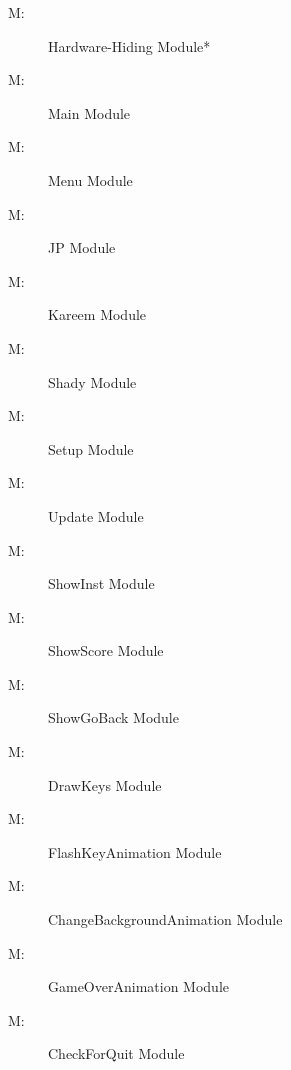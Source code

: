 \documentclass[12pt, titlepage]{article}
\newcounter{mnum}
\newcommand{\mthemnum}{M\themnum}
\begin{document}
\begin{description}
\item [ \mthemnum \label{mHH1}:] Hardware-Hiding Module*
\item [ \mthemnum \label{mHH2}:] Main Module
\item [ \mthemnum \label{mHH3}:] Menu Module
\item [ \mthemnum \label{mHH4}:] JP Module
\item [ \mthemnum \label{mHH5}:] Kareem Module 
\item [ \mthemnum \label{mHH6}:] Shady Module
\item [ \mthemnum \label{mHH7}:] Setup Module
\item [ \mthemnum \label{mHH8}:] Update Module
\item [ \mthemnum \label{mHH9}:] ShowInst Module
\item [ \mthemnum \label{mHH10}:] ShowScore Module
\item [ \mthemnum \label{mHH11}:] ShowGoBack Module
\item [ \mthemnum \label{mHH12}:] DrawKeys Module
\item [ \mthemnum \label{mHH13}:] FlashKeyAnimation Module
\item [ \mthemnum \label{mHH14}:] ChangeBackgroundAnimation Module
\item [ \mthemnum \label{mHH15}:] GameOverAnimation Module
\item [ \mthemnum \label{mHH16}:] CheckForQuit Module



\end{description}
\end{document}
